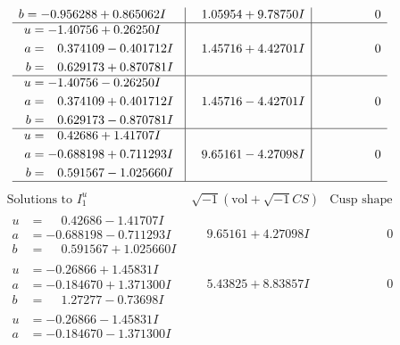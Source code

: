 \documentclass[1p]{elsarticle_modified}
\theoremstyle{definition}
\newcommand{\I}{\sqrt{-1}}
\begin{document}
$$\begin{array}{c|c|c}
\begin{aligned}
b &= -0.956288 + 0.865062 I\end{aligned}
 & \phantom{-}1.05954 + 9.78750 I & \phantom{-0.000000 } 0 \\ \hline\begin{aligned}
u &= -1.40756 + 0.26250 I \\
a &= \phantom{-}0.374109 - 0.401712 I \\
b &= \phantom{-}0.629173 + 0.870781 I\end{aligned}
 & \phantom{-}1.45716 + 4.42701 I & \phantom{-0.000000 } 0 \\ \hline\begin{aligned}
u &= -1.40756 - 0.26250 I \\
a &= \phantom{-}0.374109 + 0.401712 I \\
b &= \phantom{-}0.629173 - 0.870781 I\end{aligned}
 & \phantom{-}1.45716 - 4.42701 I & \phantom{-0.000000 } 0 \\ \hline\begin{aligned}
u &= \phantom{-}0.42686 + 1.41707 I \\
a &= -0.688198 + 0.711293 I \\
b &= \phantom{-}0.591567 - 1.025660 I\end{aligned}
 & \phantom{-}9.65161 - 4.27098 I & \phantom{-0.000000 } 0\\
 \hline 
 \end{array}$$\newpage$$\begin{array}{c|c|c}  
\text{Solutions to }I^u_{1}& \I (\text{vol} + \sqrt{-1}CS) & \text{Cusp shape}\\
 \hline 
\begin{aligned}
u &= \phantom{-}0.42686 - 1.41707 I \\
a &= -0.688198 - 0.711293 I \\
b &= \phantom{-}0.591567 + 1.025660 I\end{aligned}
 & \phantom{-}9.65161 + 4.27098 I & \phantom{-0.000000 } 0 \\ \hline\begin{aligned}
u &= -0.26866 + 1.45831 I \\
a &= -0.184670 + 1.371300 I \\
b &= \phantom{-}1.27277 - 0.73698 I\end{aligned}
 & \phantom{-}5.43825 + 8.83857 I & \phantom{-0.000000 } 0 \\ \hline\begin{aligned}
u &= -0.26866 - 1.45831 I \\
a &= -0.184670 - 1.371300 I \\

\end{aligned}
\end{array}$$
\end{document}
